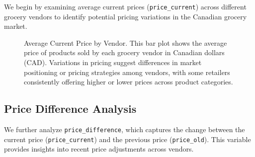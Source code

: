\documentclass[
  letterpaper,
  DIV=11,
  numbers=noendperiod]{scrartcl}
\begin{document}
We begin by examining average current prices (\texttt{price\_current})
across different grocery vendors to identify potential pricing
variations in the Canadian grocery market.

\begin{figure}


\caption{\label{fig-avg-curr-price}Average Current Price by Vendor. This
bar plot shows the average price of products sold by each grocery vendor
in Canadian dollars (CAD). Variations in pricing suggest differences in
market positioning or pricing strategies among vendors, with some
retailers consistently offering higher or lower prices across product
categories.}

\end{figure}%

\subsection{Price Difference Analysis}\label{price-difference-analysis}

We further analyze \texttt{price\_difference}, which captures the change
between the current price (\texttt{price\_current}) and the previous
price (\texttt{price\_old}). This variable provides insights into recent
price adjustments across vendors.
\end{document}
